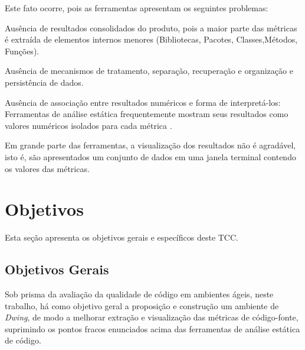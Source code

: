 Este fato ocorre, pois as ferramentas apresentam os seguintes problemas:


\begin{myList}
    \item Ausência de resultados consolidados do produto, pois a maior 
	parte das métricas é extraída de elementos internos menores (Bibliotecas, 
	Pacotes, Classes,Métodos, Funções).
    
	\item Ausência de mecanismos de tratamento, separação, recuperação e 
	organização e persistência de dados. 
	
	\item Ausência de associação entre resultados numéricos e forma de 
	interpretá-los: Ferramentas de análise estática frequentemente mostram 
	seus resultados como valores numéricos isolados para cada métrica 
	\cite{Meirelles2013}. 
	
	\item Em grande parte das ferramentas, a visualização dos resultados não é 
	agradável, isto é, são apresentados um conjunto de dados em uma janela 
	terminal contendo os valores das métricas.
	
    \end{myList}
	
	







\section{Objetivos}

Esta seção apresenta os objetivos gerais e específicos deste TCC.

\subsection{Objetivos Gerais}
Sob prisma da avaliação da qualidade de código em ambientes ágeis, 
neste trabalho, há como objetivo geral a proposição e construção um ambiente de 
\textit{Dwing}, de modo a melhorar extração e visualização das métricas de 
código-fonte, suprimindo os pontos fracos enunciados acima das ferramentas de 
análise estática de código.

